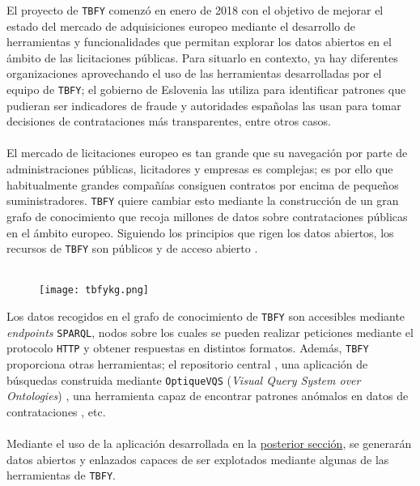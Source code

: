         \noindent El proyecto de \texttt{TBFY} comenzó en enero de 2018 con el objetivo de mejorar el estado del mercado de adquisiciones europeo mediante el desarrollo de herramientas y funcionalidades que permitan explorar los datos abiertos en el ámbito de las licitaciones públicas. Para situarlo en contexto, ya hay diferentes organizaciones aprovechando el uso de las herramientas desarrolladas por el equipo de \texttt{TBFY}; el gobierno de Eslovenia las utiliza para identificar patrones que pudieran ser indicadores de fraude y autoridades españolas las usan para tomar decisiones de contrataciones más transparentes, entre otros casos.
        \\ \\
        El mercado de licitaciones europeo es tan grande que su navegación por parte de administraciones públicas, licitadores y empresas es complejas; es por ello que habitualmente grandes compañías consiguen contratos por encima de pequeños suministradores. \texttt{TBFY} quiere cambiar esto mediante la construcción de un gran grafo de conocimiento que recoja millones de datos sobre contrataciones públicas en el ámbito europeo. Siguiendo los principios que rigen los datos abiertos, los recursos de \texttt{TBFY} son públicos y de acceso abierto \cite{TBFY}.
        \\ \\
        
        \begin{figure}[h]
            \centering
            \texttt{[image: tbfykg.png]}
        \end{figure}
        
        \noindent Los datos recogidos en el grafo de conocimiento de \texttt{TBFY} son accesibles mediante \textit{endpoints} \texttt{SPARQL}, nodos sobre los cuales se pueden realizar peticiones mediante el protocolo \texttt{HTTP} y obtener respuestas en distintos formatos. Además, \texttt{TBFY} proporciona otras herramientas; el repositorio central \cite{TBFYREPOS}, una aplicación de búsquedas construida mediante \texttt{OptiqueVQS} (\textit{Visual Query System over Ontologies}) \cite{TBFYVQS}, una herramienta capaz de encontrar patrones anómalos en datos de contrataciones \cite{TBFYANOM}, etc.
        \\ \\
        Mediante el uso de la aplicación desarrollada en la \hyperref[sec:software]{posterior sección}, se generarán datos abiertos y enlazados capaces de ser explotados mediante algunas de las herramientas de \texttt{TBFY}.

\newpage